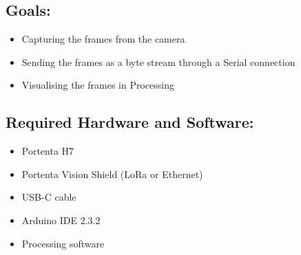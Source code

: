 \subsection{Goals:}
\begin{itemize}
	\item Capturing the frames from the camera
	\item Sending the frames as a byte stream through a Serial connection
	\item Visualising the frames in Processing
\end{itemize}

\subsection{Required Hardware and Software:}
\begin{itemize}
	\item Portenta H7
	\item Portenta Vision Shield (LoRa or Ethernet)
	\item USB-C cable
	\item Arduino IDE 2.3.2
	\item Processing software
\end{itemize}
